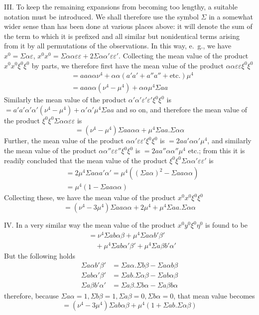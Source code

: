 III. To keep the remaining expansions from becoming too lengthy, a suitable notation must be introduced. We shall therefore use the symbol \(\Sigma\) in a somewhat wider sense than has been done at various places above: it will denote the sum of the term to which it is prefixed and all similar but nonidentical terms arising from it by all permutations of the observations. In this way, e.\ g., we have \(x^0=\Sigma\alpha\varepsilon\), \(x^0x^0=\Sigma\alpha\alpha\varepsilon\varepsilon+2\Sigma\alpha\alpha'\varepsilon\varepsilon'\). Collecting the mean value of the product \(x^0x^0\xi^0\xi^0\) by parts, we therefore first have the mean value of the product \(\alpha\alpha\varepsilon\varepsilon\xi^0\xi^0\)
\[
\begin{aligned}
&=aa\alpha\alpha\nu^4+\alpha\alpha(a'a'+a''a''+\text{etc.})\mu^4\\
&=aa\alpha\alpha(\nu^4-\mu^4)+\alpha\alpha\mu^4\Sigma aa
\end{aligned}
\]
Similarly the mean value of the product \(\alpha'\alpha'\varepsilon'\varepsilon'\xi^0\xi^0\) is \(=a'a'\alpha'\alpha'(\nu^4-\mu^4)+\alpha'\alpha'\mu^4\Sigma aa\) and so on, and therefore the mean value of the product \(\xi^0\xi^0\Sigma\alpha\alpha\varepsilon\varepsilon\) is
\[
=(\nu^4-\mu^4)\Sigma aa\alpha\alpha+\mu^4\Sigma aa.\Sigma\alpha\alpha
\]
Further, the mean value of the product \(\alpha\alpha'\varepsilon\varepsilon'\xi^0\xi^0\) is \(=2aa'\alpha\alpha'\mu^4\), and similarly the mean value of the product \(\alpha\alpha''\varepsilon\varepsilon''\xi^0\xi^0\) is \(=2aa''\alpha\alpha''\mu^4\) etc.; from this it is readily concluded that the mean value of the product \(\xi^0\xi^0\Sigma\alpha\alpha'\varepsilon\varepsilon'\) is
\[
\begin{aligned}
&=2\mu^4\Sigma a\alpha a'\alpha'=\mu^4((\Sigma a\alpha)^2-\Sigma aa\alpha\alpha)\\
&=\mu^4(1-\Sigma aa\alpha\alpha)
\end{aligned}
\]
Collecting these, we have the mean value of the product \(x^0x^0\xi^0\xi^0\)
\[
=(\nu^4-3\mu^4)\Sigma aa\alpha\alpha+2\mu^4+\mu^4\Sigma aa.\Sigma\alpha\alpha
\]

IV. In a very similar way the mean value of the product \(x^0y^0\xi^0\eta^0\) is found to be
\[
\begin{aligned}
&=\nu^4\Sigma ab\alpha\beta+\mu^4\Sigma a\alpha b'\beta'\\
&\quad+\mu^4\Sigma ab\alpha'\beta'+\mu^4\Sigma a\beta b'\alpha'
\end{aligned}
\]
But the following holds
\[
\begin{aligned}
\Sigma a\alpha b'\beta'&=\Sigma a\alpha.\Sigma b\beta-\Sigma a\alpha b\beta\\
\Sigma ab\alpha'\beta'&=\Sigma ab.\Sigma\alpha\beta-\Sigma ab\alpha\beta\\
\Sigma a\beta b'\alpha'&=\Sigma a\beta.\Sigma b\alpha-\Sigma a\beta b\alpha
\end{aligned}
\]
therefore, because \(\Sigma a\alpha=1,\allowbreak\Sigma b\beta=1,\allowbreak\Sigma a\beta=0,\allowbreak\Sigma b\alpha=0\), that mean value becomes
\[
=(\nu^4-3\mu^4)\Sigma ab\alpha\beta+\mu^4(1+\Sigma ab.\Sigma\alpha\beta)
\]

